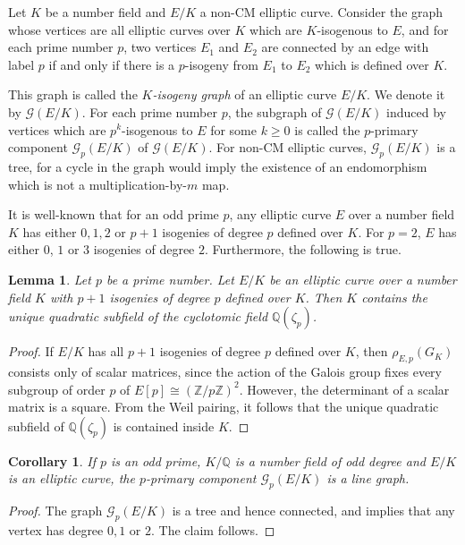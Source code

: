 \documentclass[10pt,leqno]{amsart}
\newcommand{\Z}{\mathbb{Z}}
\newcommand{\Q}{\mathbb{Q}}
\newtheorem{lemma}[theorem]{Lemma}
\newtheorem{corollary}[theorem]{Corollary}
\theoremstyle{definition}
\theoremstyle{remark}
\numberwithin{theorem}{section}
\begin{document}
Let $K$ be a number field and $E/K$ a non-CM elliptic curve. Consider the graph whose vertices are all elliptic curves over $K$ which are $K$-isogenous to $E$, and for each prime number $p$, two vertices $E_1$ and $E_2$ are connected by an edge with label $p$ if and only if there is a $p$-isogeny from $E_1$ to $E_2$ which is defined over $K$. 

This graph is called the \emph{$K$-isogeny graph} of an elliptic curve $E/K$. We denote it by $\mathcal G(E/K)$. For each prime number $p$, the subgraph of $\mathcal G(E/K)$ induced by vertices which are $p^k$-isogenous to $E$ for some $k\geq 0$ is called the $p$-primary component $\mathcal G_p(E/K)$ of $\mathcal G(E/K)$. For non-CM elliptic curves, $\mathcal G_p(E/K)$ is a tree, for a cycle in the graph would imply the existence of an endomorphism which is not a multiplication-by-$m$ map.

It is well-known that for an odd prime $p$, any elliptic curve $E$ over a number field $K$ has either $0, 1, 2$ or $p+1$ isogenies of degree $p$ defined over $K$. For $p=2$, $E$ has either $0$, $1$ or $3$ isogenies of degree $2$. Furthermore, the following is true.
\begin{lemma}\label{zetap}
    Let $p$ be a prime number. Let $E/K$ be an elliptic curve over a number field $K$ with $p+1$ isogenies of degree $p$ defined over $K$. Then $K$ contains the unique quadratic subfield of the cyclotomic field $\Q(\zeta_p)$. 
\end{lemma}
\begin{proof}
    If $E/K$ has all $p+1$ isogenies of degree $p$ defined over $K$, then $\rho_{E, p}(G_K)$ consists only of scalar matrices, since the action of the Galois group fixes every subgroup of order $p$ of $E[p]\cong (\Z/p\Z)^2$. However, the determinant of a scalar matrix is a square. From the Weil pairing, it follows that the unique quadratic subfield of $\Q(\zeta_p)$ is contained inside $K$.
\end{proof}

\begin{corollary}\label{onlylines}
    If $p$ is an odd prime, $K/\Q$ is a number field of odd degree and $E/K$ is an elliptic curve, the $p$-primary component $\mathcal G_p(E/K)$ is a line graph.
\end{corollary}
\begin{proof}
    The graph $\mathcal G_p(E/K)$ is a tree and hence connected, and  implies that any vertex has degree $0,1$ or $2$. The claim follows. 
\end{proof}
\end{document}
